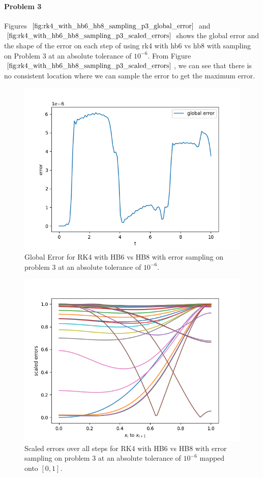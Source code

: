 \paragraph{Problem 3} Figures $\ref{fig:rk4_with_hb6_hb8_sampling_p3_global_error}$ and $\ref{fig:rk4_with_hb6_hb8_sampling_p3_scaled_errors}$ shows the global error and the shape of the error on each step of using rk4 with hb6 vs hb8 with sampling on Problem 3 at an absolute tolerance of $10^{-6}$. From Figure $\ref{fig:rk4_with_hb6_hb8_sampling_p3_scaled_errors}$, we can see that there is no consistent location where we can sample the error to get the maximum error.

\begin{figure}[H]
\centering
\includegraphics[width=0.7\linewidth]{./figures/rk4_with_hb6_hb8_sampling_p3_global_error}
\caption{Global Error for RK4 with HB6 vs HB8 with error sampling on problem 3 at an absolute tolerance of $10^{-6}$.}
\label{fig:rk4_with_hb6_hb8_sampling_p3_global_error}
\end{figure}

\begin{figure}[H]
\centering
\includegraphics[width=0.7\linewidth]{./figures/rk4_with_hb6_hb8_sampling_p3_scaled_errors}
\caption{Scaled errors over all steps for RK4 with HB6 vs HB8 with error sampling on problem 3 at an absolute tolerance of $10^{-6}$ mapped onto $[0, 1]$.}
\label{fig:rk4_with_hb6_hb8_sampling_p3_scaled_errors}
\end{figure}

